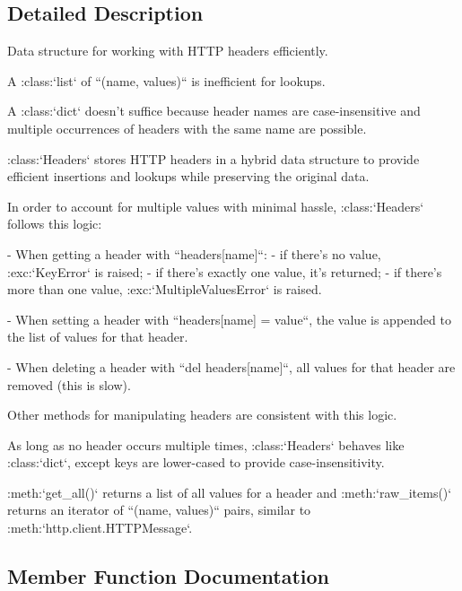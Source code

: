 \subsection{Detailed Description}
\begin{DoxyVerb}Data structure for working with HTTP headers efficiently.

A :class:`list` of ``(name, values)`` is inefficient for lookups.

A :class:`dict` doesn't suffice because header names are case-insensitive
and multiple occurrences of headers with the same name are possible.

:class:`Headers` stores HTTP headers in a hybrid data structure to provide
efficient insertions and lookups while preserving the original data.

In order to account for multiple values with minimal hassle,
:class:`Headers` follows this logic:

- When getting a header with ``headers[name]``:
    - if there's no value, :exc:`KeyError` is raised;
    - if there's exactly one value, it's returned;
    - if there's more than one value, :exc:`MultipleValuesError` is raised.

- When setting a header with ``headers[name] = value``, the value is
  appended to the list of values for that header.

- When deleting a header with ``del headers[name]``, all values for that
  header are removed (this is slow).

Other methods for manipulating headers are consistent with this logic.

As long as no header occurs multiple times, :class:`Headers` behaves like
:class:`dict`, except keys are lower-cased to provide case-insensitivity.

:meth:`get_all()` returns a list of all values for a header and
:meth:`raw_items()` returns an iterator of ``(name, values)`` pairs,
similar to :meth:`http.client.HTTPMessage`.\end{DoxyVerb}
 

\subsection{Member Function Documentation}
\mbox{\label{classwebsockets_1_1http_1_1_headers_a7192693c16f55372225392677fff9d22}} 
